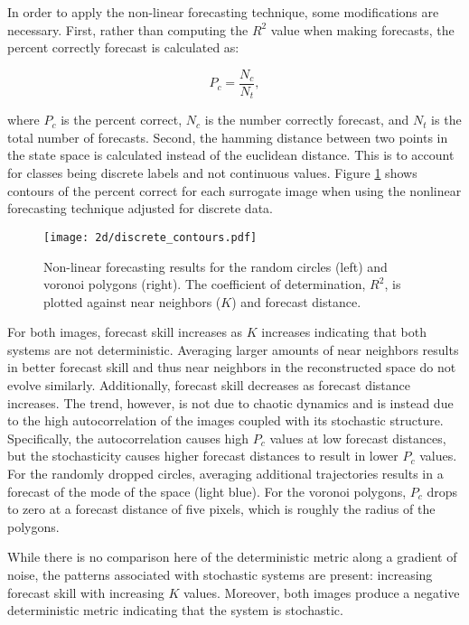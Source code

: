 In order to apply the non-linear forecasting technique, some modifications are necessary. First, rather than computing the $R^2$ value when making forecasts, the percent correctly forecast is calculated as:

$$ P_c = \frac{ N_c}{ N_t},$$

where $P_c$ is the percent correct, $N_c$ is the number correctly forecast, and $N_t$ is the total number of forecasts. Second, the hamming distance between two points in the state space is calculated instead of the euclidean distance. This is to account for classes being discrete labels and not continuous values. Figure \ref{discrete_contours} shows contours of the percent correct for each surrogate image when using the nonlinear forecasting technique adjusted for discrete data. 

\begin{figure}[htbp]  %
   \centering
   \texttt{[image: 2d/discrete\_contours.pdf]} 
   \caption{Non-linear forecasting results for the random circles (left) and voronoi polygons (right). The coefficient of determination, $R^2$, is plotted against near neighbors ($K$) and forecast distance.}
   \label{discrete_contours}
\end{figure}

For both images, forecast skill increases as $K$ increases indicating that both systems are not deterministic. Averaging larger amounts of near neighbors results in better forecast skill and thus near neighbors in the reconstructed space do not evolve similarly. Additionally, forecast skill decreases as forecast distance increases. The trend, however, is not due to chaotic dynamics and is instead due to the high autocorrelation of the images coupled with its stochastic structure. Specifically, the autocorrelation causes high $P_c$ values at low forecast distances, but the stochasticity causes higher forecast distances to result in lower $P_c$ values. For the randomly dropped circles, averaging additional trajectories results in a forecast of the mode of the space (light blue). For the voronoi polygons, $P_c$ drops to zero at a forecast distance of five pixels, which is roughly the radius of the polygons.

While there is no comparison here of the deterministic metric along a gradient of noise, the patterns associated with stochastic systems are present: increasing forecast skill with increasing $K$ values. Moreover, both images produce a negative deterministic metric indicating that the system is stochastic.







